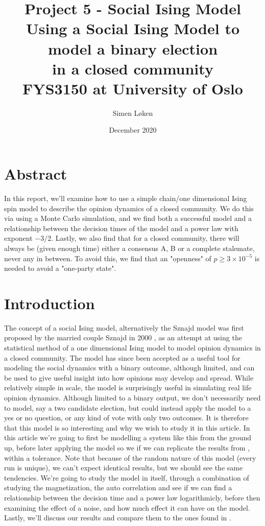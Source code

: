 \documentclass{article}
\title{%
Project 5 - Social Ising Model\\
\large Using a Social Ising Model to model a binary election \\
\large in a closed community \\
\large FYS3150 at University of Oslo}
\author{Simen Løken}
\date{December 2020}
\begin{document}
\maketitle
{
  \hypersetup{linkcolor=black}
  \tableofcontents
}
\newpage
\section{Abstract}
In this report, we'll examine how to use a simple chain/one dimensional Ising spin model to describe the opinion dynamics of a closed community. We do this via using a Monte Carlo simulation, and we find both a successful model and a relationship between the decision times of the model and a power law with exponent $-3/2$. Lastly, we also find that for a closed community, there will always be (given enough time) either a consensus A, B or a complete stalemate, never any in between. To avoid this, we find that an "openness" of $p \geq 3\times 10^{-5}$ is needed to avoid a "one-party state".
\section{Introduction}
The concept of a social Ising model, alternatively the Sznajd model was first proposed by the married couple Sznajd in 2000 \cite{sznajd}, as an attempt at using the statistical method of a one dimensional Ising model to model opinion dynamics in a closed community. The model has since been accepted as a useful tool for modeling the social dynamics with a binary outcome, although limited, and can be used to give useful insight into how opinions may develop and spread.\newline
While relatively simple in scale, the model is surprisingly useful in simulating real life opinion dynamics. Although limited to a binary output, we don't necessarily need to model, say a two candidate election, but could instead apply the model to a yes or no question, or any kind of vote with only two outcomes. It is therefore that this model is so interesting and why we wish to study it in this article.\newline
In this article we're going to first be modelling a system like this from the ground up, before later applying the model so we if we can replicate the results from \cite{sznajd}, within a tolerance. Note that because of the random nature of this model (every run is unique), we can't expect identical results, but we should see the same tendencies. We're going to study the model in itself, through a combination of studying the magnetization, the auto correlation and see if we can find a relationship between the decision time and a power law logarithmicly, before then examining the effect of a noise, and how much effect it can have on the model. Lastly, we'll discuss our results and compare them to the ones found in \cite{sznajd}.
\end{document}
